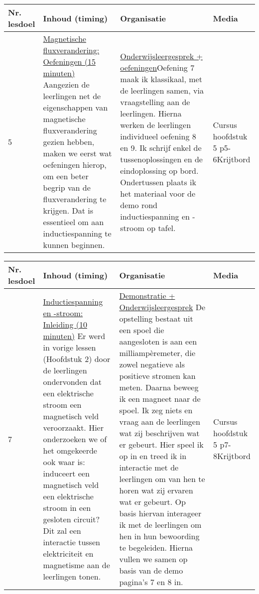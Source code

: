 \begin{landscape}
\begin{tabularx}{1.56\textwidth}{|p{1.5cm}|p{9cm}|X|p{4cm}|}
	\hline
	\textbf{Nr. lesdoel } & \textbf{Inhoud (timing)}  & \textbf{Organisatie } & \textbf{Media } \\ \hline
	5\newline\newline 6& \underline{Magnetische fluxverandering:} \underline{Oefeningen (15 minuten)}\newline
	Aangezien de leerlingen net de eigenschappen van magnetische fluxverandering gezien hebben, maken we eerst wat oefeningen hierop, om een beter begrip van de fluxverandering te krijgen. Dat is essentieel om aan inductiespanning te kunnen beginnen.
	&  \underline{Onderwijsleergesprek + oefeningen}\newline  Oefening 7 maak ik klassikaal, met de leerlingen samen, via vraagstelling aan de leerlingen. Hierna werken de leerlingen individueel oefening 8 en 9. Ik schrijf enkel de tussenoplossingen en de eindoplossing op bord. Ondertussen plaats ik het materiaal voor de demo rond inductiespanning en -stroom op tafel.
	&  Cursus hoofdstuk 5 p5-6\newline\newline Krijtbord
	\\ \hline
\end{tabularx}\vspace{5mm}



\begin{tabularx}{1.56\textwidth}{|p{1.5cm}|p{9cm}|X|p{4cm}|}
	\hline
	\textbf{Nr. lesdoel } & \textbf{Inhoud (timing)}  & \textbf{Organisatie } & \textbf{Media } \\ \hline
	7\newline\newline 8& \underline{Inductiespanning en -stroom:} \underline{Inleiding (10 minuten)}\newline
	Er werd in vorige lessen (Hoofdstuk 2) door de leerlingen ondervonden dat een elektrische stroom een magnetisch veld veroorzaakt. Hier onderzoeken we of het omgekeerde ook waar is: induceert een magnetisch veld een elektrische stroom in een gesloten circuit? Dit zal een interactie tussen elektriciteit en magnetisme aan de leerlingen tonen.
	&  \underline{Demonstratie + Onderwijsleergesprek}\newline 
	De opstelling bestaat uit een spoel die aangesloten is aan een milliampèremeter, die zowel negatieve als positieve stromen kan meten. Daarna beweeg ik een magneet naar de spoel. Ik zeg niets en vraag aan de leerlingen wat zij beschrijven wat er gebeurt. Hier speel ik op in en treed ik in interactie met de leerlingen om van hen te horen wat zij ervaren wat er gebeurt.	Op basis hiervan interageer ik met de leerlingen om hen in hun bewoording te begeleiden. Hierna vullen we samen op basis van de demo pagina's 7 en 8 in.
	&  Cursus hoofdstuk 5 p7-8\newline\newline Krijtbord
	\\ \hline
\end{tabularx}\vspace{5mm}





\end{landscape}
